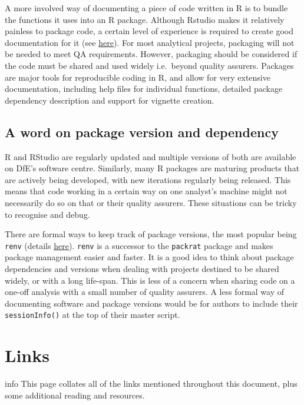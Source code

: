 \documentclass[
]{book}
\begin{document}
A more involved way of documenting a piece of code written in R is to bundle the functions it uses into an R package. Although Rstudio makes it relatively painless to package code, a certain level of experience is required to create good documentation for it (see \href{http://r-pkgs.had.co.nz/}{here}). For most analytical projects, packaging will not be needed to meet QA requirements. However, packaging should be considered if the code must be shared and used widely i.e.~beyond quality assurers. Packages are major tools for reproducible coding in R, and allow for very extensive documentation, including help files for individual functions, detailed package dependency description and support for vignette creation.

\hypertarget{a-word-on-package-version-and-dependency}{%
\section{A word on package version and dependency}\label{a-word-on-package-version-and-dependency}}

R and RStudio are regularly updated and multiple versions of both are available on DfE's software centre. Similarly, many R packages are maturing products that are actively being developed, with new iterations regularly being released. This means that code working in a certain way on one analyst's machine might not necessarily do so on that or their quality assurers. These situations can be tricky to recognise and debug.

There are formal ways to keep track of package versions, the most popular being \texttt{renv} (details \href{https://rstudio.github.io/renv/articles/renv.html}{here}). \texttt{renv} is a successor to the \texttt{packrat} package and makes package management easier and faster. It is a good idea to think about package dependencies and versions when dealing with projects destined to be shared widely, or with a long life-span. This is less of a concern when sharing code on a one-off analysis with a small number of quality assurers. A less formal way of documenting software and package versions would be for authors to include their \texttt{sessionInfo()} at the top of their master script.

\hypertarget{links}{%
\chapter{Links}\label{links}}

\begin{infoboxblue}info
This page collates all of the links mentioned throughout this document, plus some additional reading and resources.

\end{infoboxblue}
\end{document}
